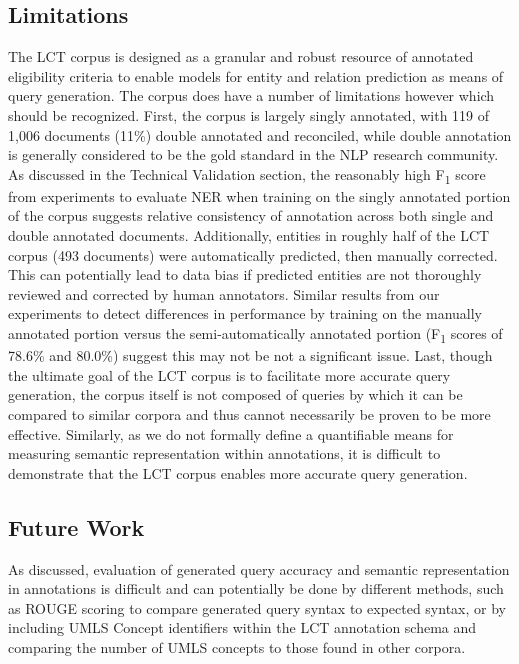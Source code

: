 \documentclass[fleqn,10pt]{wlscirep}
\begin{document}
\subsection*{Limitations}
\noindent The LCT corpus is designed as a granular and robust resource of annotated eligibility criteria to enable models for entity and relation prediction as means of query generation. The corpus does have a number of limitations however which should be recognized. First, the corpus is largely singly annotated, with 119 of 1,006 documents (11\%) double annotated and reconciled, while double annotation is generally considered to be the gold standard in the NLP research community. As discussed in the Technical Validation section, the reasonably high F\textsubscript{1} score from experiments to evaluate NER when training on the singly annotated portion of the corpus suggests relative consistency of annotation across both single and double annotated documents. Additionally, entities in roughly half of the LCT corpus (493 documents) were automatically predicted, then manually corrected. This can potentially lead to data bias if predicted entities are not thoroughly reviewed and corrected by human annotators. Similar results from our experiments to detect differences in performance by training on the manually annotated portion versus the semi-automatically annotated portion (F\textsubscript{1} scores of 78.6\% and 80.0\%) suggest this may not be not a significant issue. Last, though the ultimate goal of the LCT corpus is to facilitate more accurate query generation, the corpus itself is not composed of queries by which it can be compared to similar corpora and thus cannot necessarily be proven to be more effective. Similarly, as we do not formally define a quantifiable means for measuring semantic representation within annotations, it is difficult to demonstrate that the LCT corpus enables more accurate query generation. \\

\subsection*{Future Work}
\noindent As discussed, evaluation of generated query accuracy and semantic representation in annotations is difficult and can potentially be done by different methods, such as ROUGE scoring \cite{lin2004rouge} to compare generated query syntax to expected syntax, or by including UMLS Concept identifiers \cite{bodenreider2004unified} within the LCT annotation schema and comparing the number of UMLS concepts to those found in other corpora. \\
\end{document}
